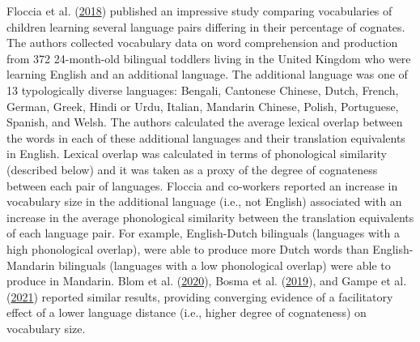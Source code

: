 \documentclass[
]{article}
\begin{document}
Floccia et al. (\protect\hyperlink{ref-floccia2018introduction}{2018})
published an impressive study comparing vocabularies of children
learning several language pairs differing in their percentage of
cognates. The authors collected vocabulary data on word comprehension
and production from 372 24-month-old bilingual toddlers living in the
United Kingdom who were learning English and an additional language. The
additional language was one of 13 typologically diverse languages:
Bengali, Cantonese Chinese, Dutch, French, German, Greek, Hindi or Urdu,
Italian, Mandarin Chinese, Polish, Portuguese, Spanish, and Welsh. The
authors calculated the average lexical overlap between the words in each
of these additional languages and their translation equivalents in
English. Lexical overlap was calculated in terms of phonological
similarity (described below) and it was taken as a proxy of the degree
of cognateness between each pair of languages. Floccia and co-workers
reported an increase in vocabulary size in the additional language
(i.e., not English) associated with an increase in the average
phonological similarity between the translation equivalents of each
language pair. For example, English-Dutch bilinguals (languages with a
high phonological overlap), were able to produce more Dutch words than
English-Mandarin bilinguals (languages with a low phonological overlap)
were able to produce in Mandarin. Blom et al.
(\protect\hyperlink{ref-blom2020crosslanguage}{2020}), Bosma et al.
(\protect\hyperlink{ref-bosma2019longitudinal}{2019}), and Gampe et al.
(\protect\hyperlink{ref-gampe2021does}{2021}) reported similar results,
providing converging evidence of a facilitatory effect of a lower
language distance (i.e., higher degree of cognateness) on vocabulary
size.
\end{document}
